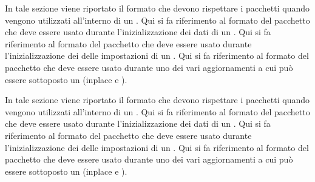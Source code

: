         In tale sezione viene riportato il formato che devono rispettare i pacchetti  quando vengono utilizzati all'interno di un .
            Qui si fa riferimento al formato del pacchetto  che deve essere usato durante l'inizializzazione dei dati di un .
            \ignoreglo{}
            Qui si fa riferimento al formato del pacchetto  che deve essere usato durante l'inizializzazione dei delle impostazioni di un .
            \ignoreglo{}
            Qui si fa riferimento al formato del pacchetto  che deve essere usato durante uno dei vari aggiornamenti a cui può essere sottoposto un  (inplace e ).
                \ignoreglo{}
                \ignoreglo{}

        In tale sezione viene riportato il formato che devono rispettare i pacchetti  quando vengono utilizzati all'interno di un .
            Qui si fa riferimento al formato del pacchetto  che deve essere usato durante l'inizializzazione dei dati di un .
            \ignoreglo{}
            Qui si fa riferimento al formato del pacchetto  che deve essere usato durante l'inizializzazione dei delle impostazioni di un .
            \ignoreglo{}
            Qui si fa riferimento al formato del pacchetto  che deve essere usato durante uno dei vari aggiornamenti a cui può essere sottoposto un  (inplace e ).
                \ignoreglo{}
                \ignoreglo{}


